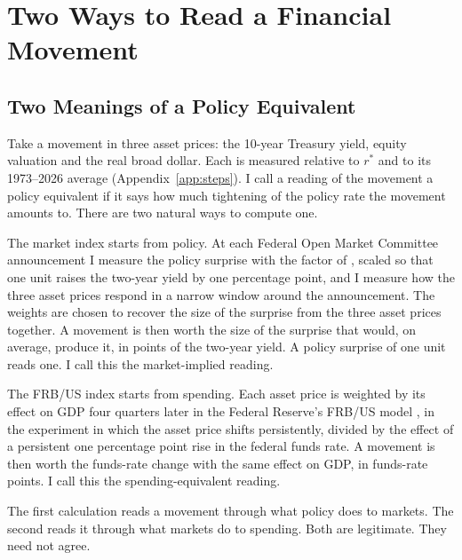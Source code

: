 \documentclass[11pt]{article}
\begin{document}
\section{Two Ways to Read a Financial Movement}\label{sec:indexes}
\subsection{Two Meanings of a Policy Equivalent}\label{sec:meanings}
Take a movement in three asset prices: the 10-year Treasury yield, equity valuation and the real broad dollar. Each is measured relative to $r^*$ and to its 1973--2026 average (Appendix~\ref{app:steps}). I call a reading of the movement a policy equivalent if it says how much tightening of the policy rate the movement amounts to. There are two natural ways to compute one.

The market index starts from policy. At each Federal Open Market Committee announcement I measure the policy surprise with the factor of \citet{nakamura2018}, scaled so that one unit raises the two-year yield by one percentage point, and I measure how the three asset prices respond in a narrow window around the announcement. The weights are chosen to recover the size of the surprise from the three asset prices together. A movement is then worth the size of the surprise that would, on average, produce it, in points of the two-year yield. A policy surprise of one unit reads one. I call this the market-implied reading.

The FRB/US index starts from spending. Each asset price is weighted by its effect on GDP four quarters later in the Federal Reserve's FRB/US model \citep{brayton2014}, in the experiment in which the asset price shifts persistently, divided by the effect of a persistent one percentage point rise in the federal funds rate. A movement is then worth the funds-rate change with the same effect on GDP, in funds-rate points. I call this the spending-equivalent reading.

The first calculation reads a movement through what policy does to markets. The second reads it through what markets do to spending. Both are legitimate. They need not agree.
\end{document}

